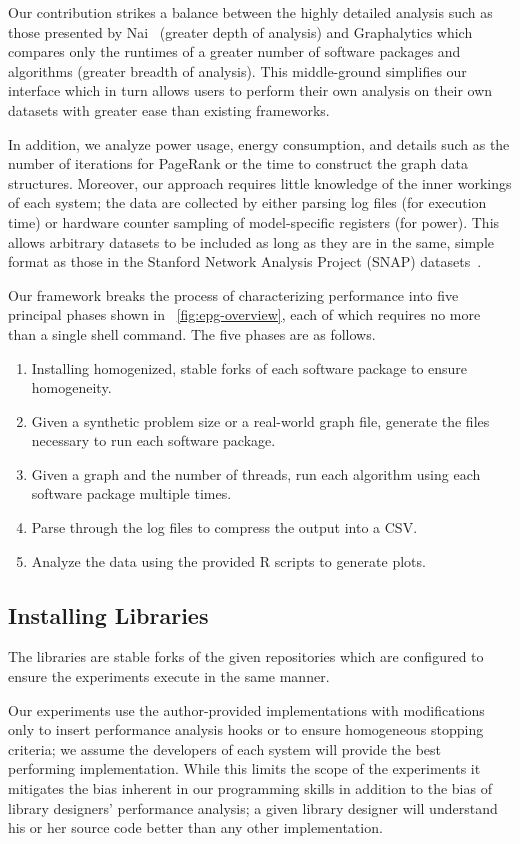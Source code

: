 \documentclass[conference]{IEEEtran}
\begin{document}
Our contribution strikes a balance between the highly detailed analysis such as those presented by Nai~\cite{Nai:2016:architectural} (greater depth of analysis) and Graphalytics which compares only the runtimes of a greater number of software packages and algorithms (greater breadth of analysis). This middle-ground simplifies our interface which in turn allows users to perform their own analysis on their own datasets with greater ease than existing frameworks.

In addition, we analyze  power usage, energy consumption, and details such as the number of iterations for PageRank or the time to construct the graph data structures. Moreover, our approach requires little knowledge of the inner workings of each system; the data are collected by either parsing log files (for execution time) or hardware counter sampling of model-specific registers (for power). This allows arbitrary datasets to be included as long as they are in the same, simple format as those in the Stanford Network Analysis Project (SNAP) datasets~\cite{snapnets}.

Our framework breaks the process of characterizing performance into five principal phases shown in \figurename~\ref{fig:epg-overview}, each of which requires no more than a single shell command. The five phases are as follows.
\begin{enumerate}
	\item Installing homogenized, stable forks of each software package to ensure homogeneity.
	\item Given a synthetic problem size or a real-world graph file, generate the files necessary to run each software package.
	\item Given a graph and the number of threads, run each algorithm using each software package multiple times.
	\item Parse through the log files to compress the output into a CSV.
	\item Analyze the data using the provided R scripts to generate plots.
\end{enumerate}

\subsection{Installing Libraries}
The libraries are stable forks of the given repositories which are configured to ensure the experiments execute in the same manner.

Our experiments use the author-provided implementations with modifications only to insert performance analysis hooks or to ensure homogeneous stopping criteria; we assume the developers of each system will provide the best performing implementation. While this limits the scope of the experiments it mitigates the bias inherent in our programming skills in addition to the bias of library designers' performance analysis; a given library designer will understand his or her source code better than any other implementation.
\end{document}

